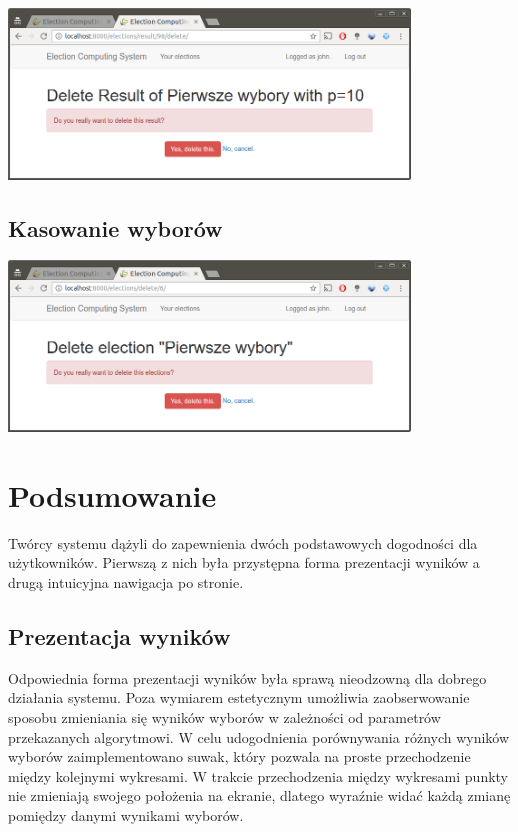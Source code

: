 \documentclass[pdflatex,11pt]{../aghdoc}
\begin{document}
\includegraphics[width=0.8\textwidth]{pics/delete-result.png}


\section{Kasowanie wyborów}
\label{sec:kasowaniewyborow}

\includegraphics[width=0.8\textwidth]{pics/delete-elections.png}



\chapter{Podsumowanie}
\label{cha:podsumowanie}

Twórcy systemu dążyli do zapewnienia dwóch podstawowych dogodności dla użytkowników. Pierwszą z nich była przystępna forma prezentacji wyników a drugą intuicyjna nawigacja po stronie.

\section{Prezentacja wyników}
Odpowiednia forma prezentacji wyników była sprawą nieodzowną dla dobrego działania systemu. Poza wymiarem estetycznym umożliwia zaobserwowanie sposobu zmieniania się wyników wyborów w zależności od parametrów przekazanych algorytmowi. W celu udogodnienia porównywania różnych wyników wyborów zaimplementowano suwak, który pozwala na proste przechodzenie między kolejnymi wykresami. W trakcie przechodzenia między wykresami punkty nie zmieniają swojego położenia na ekranie, dlatego wyraźnie widać każdą zmianę pomiędzy danymi wynikami wyborów.
 
\end{document}
